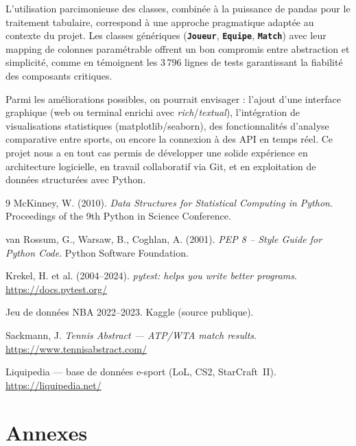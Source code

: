 \documentclass[12pt,a4paper]{article}
\newcommand{\classe}[1]{\texttt{\textbf{#1}}}
\begin{document}
L'utilisation parcimonieuse des classes, combinée à la puissance de pandas pour le
traitement tabulaire, correspond à une approche pragmatique adaptée au contexte du
projet. Les classes génériques (\classe{Joueur}, \classe{Equipe}, \classe{Match}) avec
leur mapping de colonnes paramétrable offrent un bon compromis entre abstraction et
simplicité, comme en témoignent les 3\,796 lignes de tests garantissant la fiabilité
des composants critiques.

Parmi les améliorations possibles, on pourrait envisager : l'ajout d'une interface
graphique (web ou terminal enrichi avec \textit{rich}/\textit{textual}), l'intégration
de visualisations statistiques (matplotlib/seaborn), des fonctionnalités d'analyse
comparative entre sports, ou encore la connexion à des API en temps réel. Ce projet nous
a en tout cas permis de développer une solide expérience en architecture logicielle,
en travail collaboratif via Git, et en exploitation de données structurées avec Python.

\newpage
\begin{thebibliography}{9}
    McKinney, W. (2010).
    \textit{Data Structures for Statistical Computing in Python}.
    Proceedings of the 9th Python in Science Conference.

    van Rossum, G., Warsaw, B., Coghlan, A. (2001).
    \textit{PEP 8 -- Style Guide for Python Code}.
    Python Software Foundation.

    Krekel, H. et al. (2004--2024).
    \textit{pytest: helps you write better programs}.
    \url{https://docs.pytest.org/}

    Jeu de données NBA 2022--2023.
    Kaggle (source publique).

    Sackmann, J.
    \textit{Tennis Abstract --- ATP/WTA match results}.
    \url{https://www.tennisabstract.com/}

    Liquipedia --- base de données e-sport (LoL, CS2, StarCraft~II).
    \url{https://liquipedia.net/}
\end{thebibliography}

\newpage
\appendix
\renewcommand{\thesection}{\Alph{section}}
\section*{Annexes}
\end{document}
